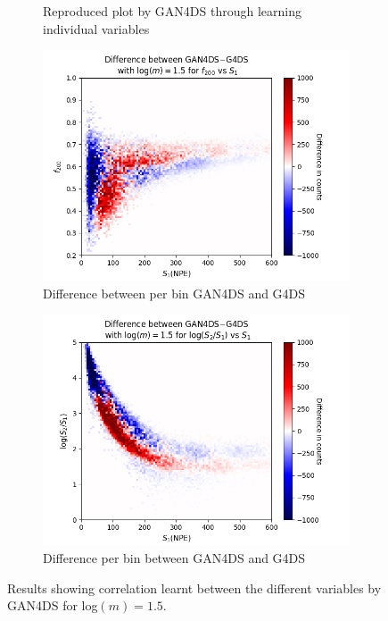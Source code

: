 \documentclass[11pt]{article} %
\begin{document}
\begin{figure}[H]
\begin{minipage}{\textwidth}
\begin{subfigure}{.5\textwidth}
      \caption{Reproduced plot by GAN4DS through learning individual variables}
  \end{subfigure}
\end{minipage}
\begin{minipage}{\textwidth}
  \begin{subfigure}{.5\textwidth}
      \centering\captionsetup{width=.8\linewidth}%
      \includegraphics[scale=0.5]{./images/1.5/difference_f200_vs_s1.png}
      \caption{Difference between per bin GAN4DS and G4DS}
  \end{subfigure}
  \begin{subfigure}{.5\textwidth}
      \centering\captionsetup{width=.8\linewidth}%
      \includegraphics[scale=0.5]{./images/1.5/difference_s1_over_s2_vs_s1.png}
      \caption{Difference per bin between GAN4DS and G4DS}
  \end{subfigure}
\end{minipage}
\caption{Results showing correlation learnt between the different variables by GAN4DS for log$(m)=1.5$.}
\label{fig:corr_results_1_5}
\end{figure}
\end{document}
